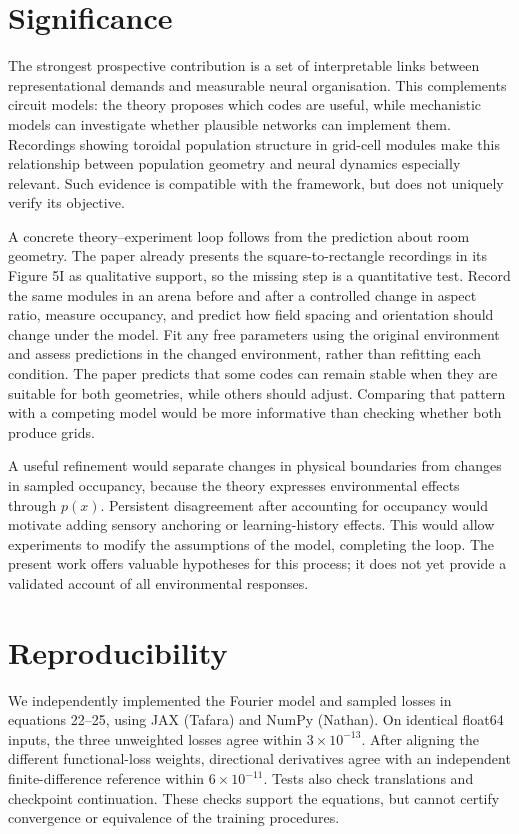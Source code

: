 \documentclass[10pt,letterpaper]{article}
\begin{document}
\section{Significance}
The strongest prospective contribution is a set of interpretable links between representational demands and measurable neural organisation. This complements circuit models: the theory proposes which codes are useful, while mechanistic models can investigate whether plausible networks can implement them. Recordings showing toroidal population structure in grid-cell modules \citep{gardner2022} make this relationship between population geometry and neural dynamics especially relevant. Such evidence is compatible with the framework, but does not uniquely verify its objective.

A concrete theory--experiment loop follows from the prediction about room geometry. The paper already presents the square-to-rectangle recordings in its Figure 5I as qualitative support, so the missing step is a quantitative test. Record the same modules in an arena before and after a controlled change in aspect ratio, measure occupancy, and predict how field spacing and orientation should change under the model. Fit any free parameters using the original environment and assess predictions in the changed environment, rather than refitting each condition. The paper predicts that some codes can remain stable when they are suitable for both geometries, while others should adjust. Comparing that pattern with a competing model would be more informative than checking whether both produce grids.

A useful refinement would separate changes in physical boundaries from changes in sampled occupancy, because the theory expresses environmental effects through $p(x)$. Persistent disagreement after accounting for occupancy would motivate adding sensory anchoring or learning-history effects. This would allow experiments to modify the assumptions of the model, completing the loop. The present work offers valuable hypotheses for this process; it does not yet provide a validated account of all environmental responses.

\section{Reproducibility}
We independently implemented the Fourier model and sampled losses in equations 22--25, using JAX (Tafara) and NumPy (Nathan). On identical float64 inputs, the three unweighted losses agree within $3\times10^{-13}$. After aligning the different functional-loss weights, directional derivatives agree with an independent finite-difference reference within $6\times10^{-11}$. Tests also check translations and checkpoint continuation. These checks support the equations, but cannot certify convergence or equivalence of the training procedures.
\end{document}
